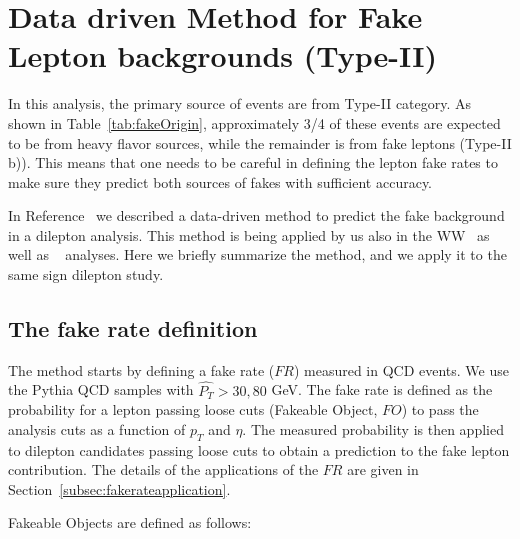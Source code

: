 \section{Data driven Method for Fake Lepton backgrounds (Type-II)}
\label{sec:leptonfake}

In this analysis, the primary source of events are from Type-II category. 
As shown in Table~\ref{tab:fakeOrigin}, approximately 3/4 of these events are expected to be from 
heavy flavor sources, while the remainder is from
fake leptons (Type-II b)). This means that one needs to be careful in defining the lepton fake rates
to make sure they predict both sources of fakes with sufficient accuracy.

In Reference~\cite{fakelep} we described a data-driven method to predict the fake 
background in a dilepton analysis. This method is being applied by us also 
in the WW~\cite{ww} as well as \ttbar ~\cite{ttbar} analyses. Here we briefly
summarize the method, and we apply it to the same sign dilepton study.

\subsection{The fake rate definition}
\label{subsec:fakeratedef}

The method starts by defining a fake rate ($FR$) measured in QCD events. We use 
the Pythia QCD samples with $\hat{P_T} > 30, 80 $ GeV. The fake rate is defined as 
the probability for a lepton passing loose cuts (Fakeable Object, $FO$) to pass the 
analysis cuts as a function of $p_T$ and $\eta$. The measured probability is then applied to 
dilepton candidates passing loose cuts to obtain a prediction to the fake lepton contribution. 
The details of the applications of the $FR$ are given in Section~\ref{subsec:fakerateapplication}. 

Fakeable Objects are defined as follows:

